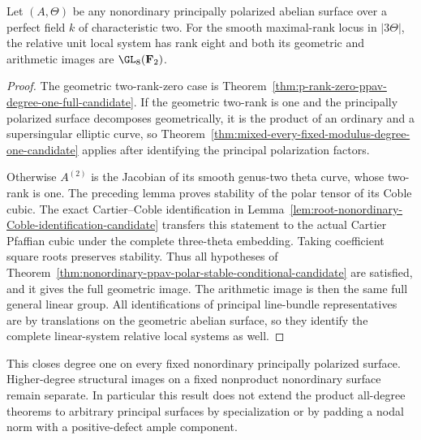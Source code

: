 \begin{theorem}
\label{thm:every-nonordinary-ppav-degree-one-full-candidate}
Let $(A,\Theta)$ be any nonordinary principally polarized abelian
surface over a perfect field $k$ of characteristic two.
For the smooth maximal-rank locus in $|3\Theta|$, the relative
unit local system has rank eight and both its geometric and
arithmetic images are $\GL_8(\mathbf F_2)$.
\end{theorem}
\begin{proof}
The geometric two-rank-zero case is
Theorem~\ref{thm:p-rank-zero-ppav-degree-one-full-candidate}.
If the geometric two-rank is one and the principally polarized
surface decomposes geometrically, it is the product of an ordinary
and a supersingular elliptic curve, so
Theorem~\ref{thm:mixed-every-fixed-modulus-degree-one-candidate}
applies after identifying the principal polarization factors.

Otherwise $A^{(2)}$ is the Jacobian of its smooth genus-two theta
curve, whose two-rank is one. The preceding lemma proves stability
of the polar tensor of its Coble cubic. The exact Cartier--Coble
identification in
Lemma~\ref{lem:root-nonordinary-Coble-identification-candidate}
transfers this statement to the actual Cartier Pfaffian cubic under
the complete three-theta embedding. Taking coefficient square roots
preserves stability. Thus all hypotheses of
Theorem~\ref{thm:nonordinary-ppav-polar-stable-conditional-candidate}
are satisfied, and it gives the full geometric image. The arithmetic
image is then the same full general linear group. All identifications
of principal line-bundle representatives are by translations on the
geometric abelian surface, so they identify the complete linear-system
relative local systems as well.
\end{proof}

\begin{remark}
\label{rem:nonordinary-ppav-degree-one-next-gate-candidate}
This closes degree one on every fixed nonordinary principally
polarized surface. Higher-degree structural images on a fixed
nonproduct nonordinary surface remain separate. In particular this
result does not extend the product all-degree theorems to arbitrary
principal surfaces by specialization or by padding a nodal norm
with a positive-defect ample component.
\end{remark}
